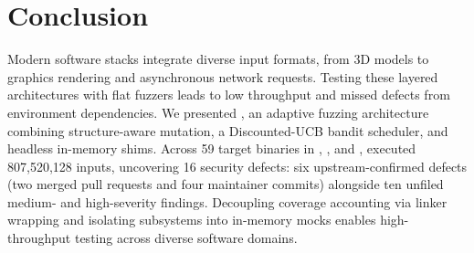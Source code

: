\section{Conclusion}
\label{sec:conclusion}
Modern software stacks integrate diverse input formats, from 3D models to graphics rendering and asynchronous network requests.
Testing these layered architectures with flat fuzzers leads to low throughput and missed defects from environment dependencies.
We presented \tool, an adaptive fuzzing architecture combining structure-aware mutation, a Discounted-UCB bandit scheduler, and headless in-memory shims.
Across 59 target binaries in \fastgltf, \raylib, and \drogon, \tool executed 807{,}520{,}128 inputs, uncovering 16 security defects: six upstream-confirmed defects (two merged pull requests and four maintainer commits) alongside ten unfiled medium- and high-severity findings.
Decoupling coverage accounting via linker wrapping and isolating subsystems into in-memory mocks enables high-throughput testing across diverse software domains.
